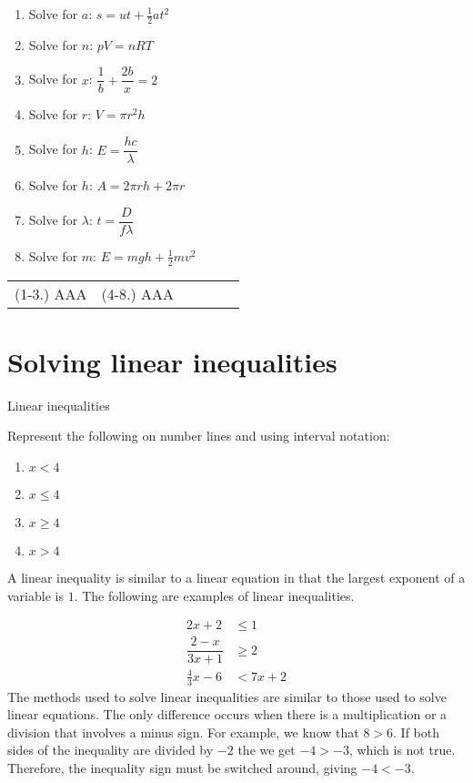 \begin{exercises}{}
{
\begin{enumerate}[itemsep=5pt, label=\textbf{\arabic*}. ] 
\item Solve for $a$: $s=ut+\frac{1}{2}at^{2}$
\item Solve for $n$: $pV=nRT$ 
\item Solve for $x$: $\dfrac{1}{b}+\dfrac{2b}{x}=2$
\item Solve for $r$: $V = \pi r^{2} h$
\item Solve for $h$: $E=\dfrac{hc}{\lambda}$
\item Solve for $h$: $A=2\pi rh + 2 \pi r$
\item Solve for $\lambda$: $t=\dfrac{D}{f \lambda}$
\item Solve for $m$: $E=mgh + \frac{1}{2}mv^{2}$
\end{enumerate}
\practiceinfo
\par 
\par \begin{tabular}[h]{cccccc}
(1-3.) AAA  &   (4-8.) AAA \end{tabular}
}
\end{exercises}

\section{Solving linear inequalities}
\nopagebreak
\begin{activity}{Linear inequalities}
{
Represent the following on number lines and using interval notation:
\begin{enumerate}[noitemsep, label=\textbf{\arabic*}. ] 
\item $x<4$
\item $x\leq 4$
\item $x\geq 4$
\item $x>4$
\end{enumerate}
}
\end{activity}
A linear inequality is similar to a linear equation in that the largest exponent of a variable is $1$. The following are examples of linear inequalities.\par 

\begin{align*}
  2x+2 &\leq 1 \\
  \dfrac{2-x}{3x+1} &\geq 2 \\
  \frac{4}{3}x-6 &< 7x+2
\end{align*}
The methods used to solve linear inequalities are similar to those used to
solve linear equations. The only difference occurs when there is a
multiplication or a division that involves a minus sign. For example, we know
that $8>6$. If both sides of the inequality are divided by $-2$ the we get $-4 > -3$, which is not true. Therefore, the inequality sign must be switched around, giving
$-4<-3$.\par


